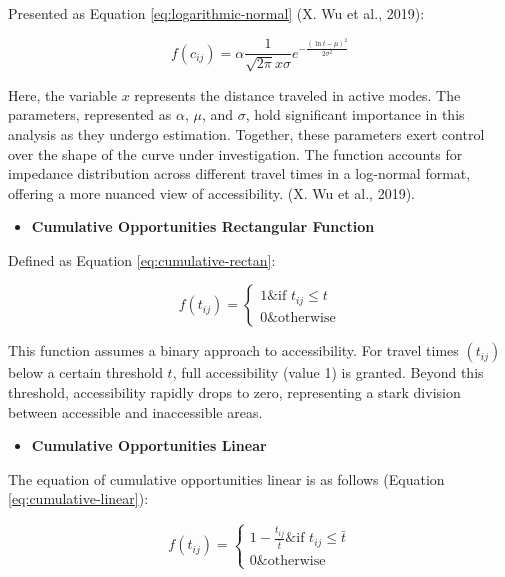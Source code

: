 \documentclass[
11pt, %
oneside, %
english, %
singlespacing, %
]{macthesis} %
\def\tightlist{}
\begin{document}
Presented as Equation \ref{eq:logarithmic-normal} (X. Wu et al., 2019):

\begin{equation}
f(c_{ij}) = \alpha \frac{1}{\sqrt{2\pi} x \sigma} e^{-\frac{(\ln t - \mu)^2}{2\sigma^2}}
\label{eq:logarithmic-normal}
\end{equation}

Here, the variable \(x\) represents the distance traveled in active modes. The parameters, represented as \(\alpha\), \(\mu\), and \(\sigma\), hold significant importance in this analysis as they undergo estimation. Together, these parameters exert control over the shape of the curve under investigation. The function accounts for impedance distribution across different travel times in a log-normal format, offering a more nuanced view of accessibility. (X. Wu et al., 2019).

\begin{itemize}
\tightlist
\item
  \textbf{Cumulative Opportunities Rectangular Function}
\end{itemize}

Defined as Equation \ref{eq:cumulative-rectan}:

\begin{equation}
f(t_{ij}) =
\begin{cases}
  1 \& \text{if } t_{ij} \le t \\
  0 \& \text{otherwise}
\end{cases}
\label{eq:cumulative-rectan}
\end{equation}

This function assumes a binary approach to accessibility. For travel times \((t_{ij})\) below a certain threshold \(t\), full accessibility (value 1) is granted. Beyond this threshold, accessibility rapidly drops to zero, representing a stark division between accessible and inaccessible areas.

\begin{itemize}
\tightlist
\item
  \textbf{Cumulative Opportunities Linear}
\end{itemize}

The equation of cumulative opportunities linear is as follows (Equation \ref{eq:cumulative-linear}):

\begin{equation}
f(t_{ij}) =
\begin{cases}
  1 - \frac{t_{ij}}{\bar{t}} \& \text{if } t_{ij} \le \bar{t} \\
  0 \& \text{otherwise}
\end{cases}
\label{eq:cumulative-linear}
\end{equation}
\end{document}
